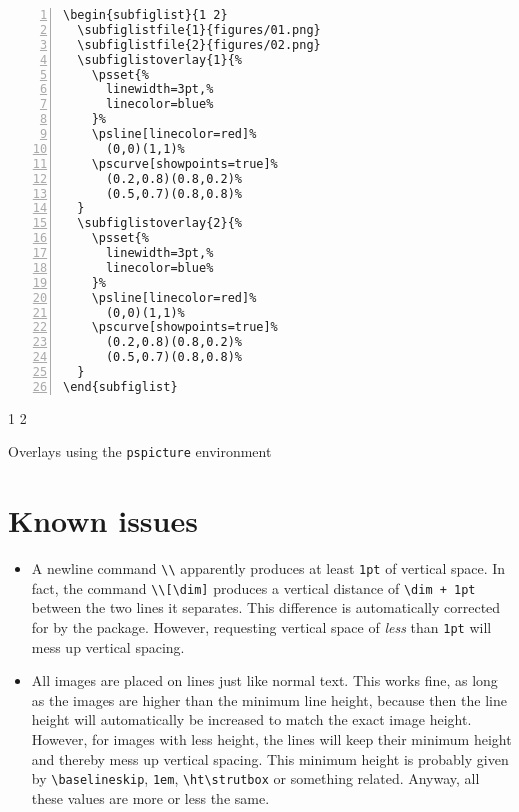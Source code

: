\documentclass[version=3.12,american]{scrartcl}
\begin{document}
\begin{listing}
\begin{minipage}{0.4\textwidth}
\begin{Verbatim}[numbers=left]
\begin{subfiglist}{1 2}
  \subfiglistfile{1}{figures/01.png}
  \subfiglistfile{2}{figures/02.png}
  \subfiglistoverlay{1}{%
    \psset{%
      linewidth=3pt,%
      linecolor=blue%
    }%
    \psline[linecolor=red]%
      (0,0)(1,1)%
    \pscurve[showpoints=true]%
      (0.2,0.8)(0.8,0.2)%
      (0.5,0.7)(0.8,0.8)%
  }
  \subfiglistoverlay{2}{%
    \psset{%
      linewidth=3pt,%
      linecolor=blue%
    }%
    \psline[linecolor=red]%
      (0,0)(1,1)%
    \pscurve[showpoints=true]%
      (0.2,0.8)(0.8,0.2)%
      (0.5,0.7)(0.8,0.8)%
  }
\end{subfiglist}
\end{Verbatim}
\end{minipage}
\hfill
\begin{minipage}{0.5\textwidth}
\begin{subfiglist}{1 2}
\end{subfiglist}
\end{minipage}
\caption{Overlays using the \texttt{pspicture} environment}
\label{lst:overlay-ps}
\end{listing}

\section{Known issues}

\begin{itemize}
\item A newline command \verb|\\| apparently produces at least \texttt{1pt} of vertical space. In fact, the command \verb|\\[\dim]| produces a vertical distance of \texttt{\textbackslash dim\,+\,1pt} between the two lines it separates. This difference is automatically corrected for by the package. However, requesting vertical space of \emph{less} than \texttt{1pt} will mess up vertical spacing.

\item All images are placed on lines just like normal text. This works fine, as long as the images are higher than the minimum line height, because then the line height will automatically be increased to match the exact image height. However, for images with less height, the lines will keep their minimum height and thereby mess up vertical spacing. This minimum height is probably given by \verb|\baselineskip|, \texttt{1em}, \verb|\ht\strutbox| or something related. Anyway, all these values are more or less the same.
\end{itemize}
\end{document}
